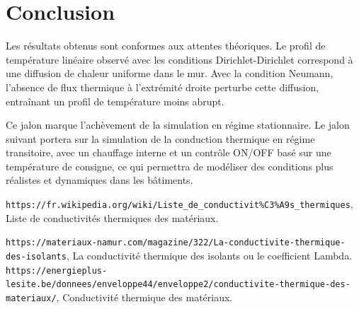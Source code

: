 \documentclass[a4paper,11pt]{article}
\begin{document}
\section{Conclusion}
Les résultats obtenus sont conformes aux attentes théoriques. Le profil de température linéaire observé avec les conditions Dirichlet-Dirichlet correspond à une diffusion de chaleur uniforme dans le mur. Avec la condition Neumann, l'absence de flux thermique à l'extrémité droite perturbe cette diffusion, entraînant un profil de température moins abrupt.

Ce jalon marque l'achèvement de la simulation en régime stationnaire. Le jalon suivant portera sur la simulation de la conduction thermique en régime transitoire, avec un chauffage interne et un contrôle ON/OFF basé sur une température de consigne, ce qui permettra de modéliser des conditions plus réalistes et dynamiques dans les bâtiments.


\newpage
\begin{thebibliography}{9}
     \texttt{https://fr.wikipedia.org/wiki/Liste\_de\_conductivit\%C3\%A9s\_thermiques}, Liste de conductivités thermiques des matériaux.

     \texttt{https://materiaux-namur.com/magazine/322/La-conductivite-thermique-des-isolants}, La conductivité thermique des isolants ou le coefficient Lambda.
    \bibitem{} \texttt{https://energieplus-lesite.be/donnees/enveloppe44/enveloppe2/conductivite-thermique-des-materiaux/}, Conductivité thermique des matériaux.
    
\end{thebibliography}
\end{document}
